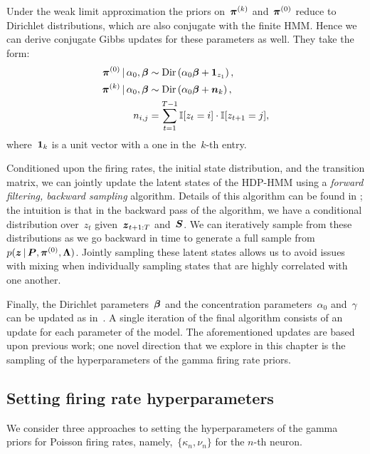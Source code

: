Under the weak limit approximation the priors on~$\boldsymbol{\pi}^{(k)}$
and~$\boldsymbol{\pi}^{(0)}$ reduce to Dirichlet distributions, which are also conjugate
with the finite HMM. Hence we can derive conjugate Gibbs updates for
these parameters as well. They take the form:
\begin{align*}
  \boldsymbol{\pi}^{(0)} \,|\, \alpha_0, \boldsymbol{\beta} &\sim \mathrm{Dir}\left(\alpha_0\boldsymbol{\beta} + \boldsymbol{1}_{z_1}\right),\\
  \boldsymbol{\pi}^{(k)} \,|\, \alpha_0, \boldsymbol{\beta} &\sim \mathrm{Dir}\left(\alpha_0\boldsymbol{\beta} + \boldsymbol{n}_{k}\right),\\
  n_{i,j}&=\sum_{t=1}^{T-1} \mathbb{I}[z_t=i] \cdot \mathbb{I}[z_{t+1}=j],
\end{align*}
where~$\boldsymbol{1}_k$ is a unit vector with a one in the~$k$-th entry.

Conditioned upon the firing rates, the initial state distribution, and
the transition matrix, we can jointly update the latent states of the
HDP-HMM using a {\em forward filtering, backward sampling}
algorithm. Details of this algorithm can be found in
\citet[e.g.]{Johnson14b}; the intuition is that in the backward pass of the
algorithm, we have a conditional distribution over~$z_t$
given~$\boldsymbol{z}_{t+1:T}$ and~$\boldsymbol{S}$. We can iteratively sample from these distributions
as we go backward in time to generate a full sample
from~${p(\boldsymbol{z} \,|\, \boldsymbol{P}, \boldsymbol{\pi}^{(0)}, \boldsymbol{\Lambda})}$. Jointly sampling
these latent states allows us to avoid issues with mixing when
individually sampling states that are highly correlated with one
another.

Finally, the Dirichlet parameters~$\boldsymbol{\beta}$ and the concentration
parameters~$\alpha_0$ and~$\gamma$ can be updated as
in~\citep{Teh06}. A single iteration of the final algorithm consists
of an update for each parameter of the model. The aforementioned
updates are based upon previous work; one novel direction that we
explore in this chapter is the sampling of the hyperparameters of the
gamma firing rate priors.

\subsection{Setting firing rate hyperparameters} 
\label{sec:fr_hypers}
We consider three approaches to setting the hyperparameters of the
gamma priors for Poisson firing rates, namely,~${\{\kappa_n,
  \nu_n\}}$ for the $n$-th neuron.  

